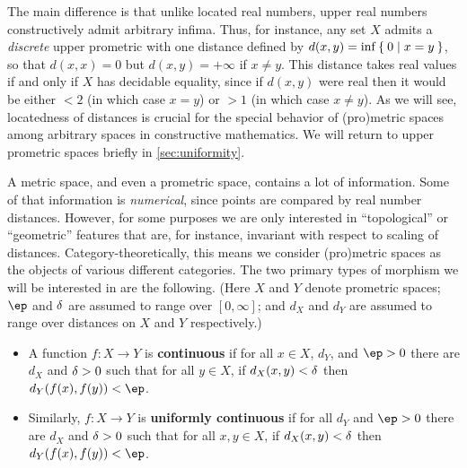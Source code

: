 \documentclass{article}
\def\Rp{[0,\infty]}
\begin{document}
The main difference is that unlike located real numbers, upper real numbers constructively admit arbitrary infima.
Thus, for instance, any set $X$ admits a \emph{discrete} upper prometric with one distance defined by $d(x,y) = \inf \Set{ 0 | x=y }$, so that $d(x,x)=0$ but $d(x,y)=+\infty$ if $x\neq y$.
This distance takes real values if and only if $X$ has decidable equality, since if $d(x,y)$ were real then it would be either $<2$ (in which case $x=y$) or $>1$ (in which case $x\neq y$).
As we will see, locatedness of distances is crucial for the special behavior of (pro)metric spaces among arbitrary spaces in constructive mathematics.
We will return to upper prometric spaces briefly in \cref{sec:uniformity}.

A metric space, and even a prometric space, contains a lot of information.
Some of that information is \emph{numerical}, since points are compared by real number distances.
However, for some purposes we are only interested in ``topological'' or ``geometric'' features that are, for instance, invariant with respect to scaling of distances.
Category-theoretically, this means we consider (pro)metric spaces as the objects of various different categories.
The two primary types of morphism we will be interested in are the following.
(Here $X$ and $Y$ denote prometric spaces; $\ep$ and $\delta$ are assumed to range over $\Rp$; and $d_X$ and $d_Y$ are assumed to range over distances on $X$ and $Y$ respectively.)

\begin{itemize}
\item A function $f:X\to Y$ is \textbf{continuous} if for all $x\in X$, $d_Y$, and $\ep>0$ there are $d_X$ and $\delta>0$ such that for all $y\in X$, if $d_X(x,y)<\delta$ then $d_Y(f(x),f(y))<\ep$.
\item Similarly, $f:X\to Y$ is \textbf{uniformly continuous} if for all $d_Y$ and $\ep>0$ there are $d_X$ and $\delta>0$ such that for all $x,y\in X$, if $d_X(x,y)<\delta$ then $d_Y(f(x),f(y))<\ep$.
\end{itemize}
\end{document}

